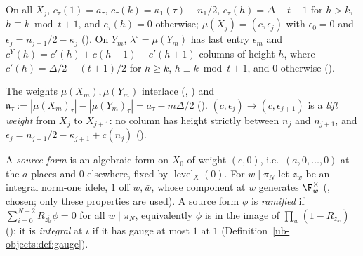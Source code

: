 \begin{definition}
\label{ub-objects:def:weights}
On all $X_j$, $c_\tau(1)=a_\tau$, $c_\tau(k)=\kappa_1(\tau)-n_1/2$, $c_\tau(h)=\Delta-t-1$ for
$h>k$, $h\equiv k\bmod t+1$, and $c_\tau(h)=0$ otherwise; $\mu(X_j)=(c,\epsilon_j)$ with $\epsilon_0=0$ and
$\epsilon_j=n_{j-1}/2-\kappa_j$ (). On $Y_m$, $\lambda^\circ=\mu(Y_m)$ has last
entry $\epsilon_m$ and $c^Y(h)=c'(h)+c(h+1)-c'(h+1)$ columns of height $h$, where $c'(h)=\Delta/2-(t+1)/2$
for $h\ge k$, $h\equiv k\bmod t+1$, and $0$ otherwise ().
\end{definition}

The weights $\mu(X_m),\mu(Y_m)$ interlace
(, ) and
$\mathfrak n_\tau:=|\mu(X_m)_\tau|-|\mu(Y_m)_\tau|=a_\tau-m\Delta/2$ ().
$(c,\epsilon_j)\to(c,\epsilon_{j+1})$ is a \emph{lift weight} from $X_j$ to $X_{j+1}$: no column has height
strictly between $n_j$ and $n_{j+1}$, and $\epsilon_j=n_{j+1}/2-\kappa_{j+1}+c(n_j)$
().

\begin{definition}\label{ub-objects:def:source}
A \emph{source form} is an algebraic form on $X_0$ of weight $(c,0)$, i.e.\ $(a,0,\dots,0)$ at the
$a$-places and $0$ elsewhere, fixed by $\operatorname{level}_X(0)$. For $w\mid\pi_N$ let $z_w$ be
an integral norm-one idele, $1$ off $w,\bar w$, whose component at $w$ generates $\F_w^\times$
(, chosen; only these properties are used). A source form $\phi$
is \emph{ramified} if $\sum_{i=0}^{N-2}R_{z_w^i}\phi=0$ for all $w\mid\pi_N$, equivalently $\phi$
is in the image of $\prod_w(1-R_{z_w})$ (); it is
\emph{integral} at $\iota$ if it has gauge at most $1$ at $1$ (Definition~\ref{ub-objects:def:gauge}).
\end{definition}


